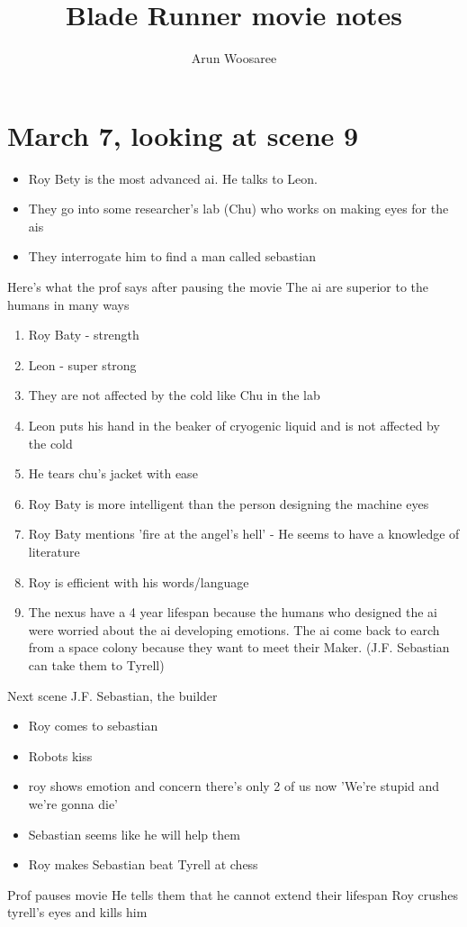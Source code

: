 \documentclass{article}
\title{Blade Runner movie notes}
\author{Arun Woosaree}
\begin{document}
  \maketitle %

  \section{March 7, looking at scene 9}


  \begin{itemize}
    \item Roy Bety is the most advanced ai. He talks to Leon.
    \item They go into some researcher's lab (Chu) who works on making eyes for the ais
    \item They interrogate him to find a man called sebastian
  \end{itemize}

  Here's what the prof says after pausing the movie
  The ai are superior to the humans in many ways
\begin{enumerate}
  \item Roy Baty - strength
  \item Leon - super strong
  \item They are not affected by the cold like Chu in the lab
  \item Leon puts his hand in the beaker of cryogenic liquid and is not affected by the cold
  \item He tears chu's jacket with ease
  \item Roy Baty is more intelligent than the person designing the machine eyes
  \item Roy Baty mentions 'fire at the angel's hell' - He seems to have a knowledge of literature
  \item Roy is efficient with his words/language
  \item The nexus have a 4 year lifespan because the humans who designed the ai were worried
        about the ai developing emotions. The ai come back to earch from a space colony because they
        want to meet their Maker. (J.F. Sebastian can take them to Tyrell)
\end{enumerate}

Next scene
J.F. Sebastian, the builder
\begin{itemize}
  \item Roy comes to sebastian
  \item Robots kiss
  \item roy shows emotion and concern there's only 2 of us now
        'We're stupid and we're gonna die'
  \item Sebastian seems like he will help them
  \item Roy makes Sebastian beat Tyrell at chess
\end{itemize}
Prof pauses movie
He tells them that he cannot extend their lifespan
Roy crushes tyrell's eyes and kills him
\end{document}
